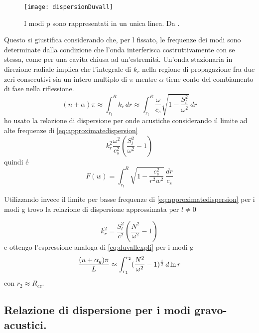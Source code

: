 \documentclass[../main.tex]{subfiles}
\begin{document}
\begin{wrapfigure}[15]{r}{0.45\textwidth}
\centering
\texttt{[image: dispersionDuvall]}
\caption{I modi p sono rappresentati in un unica linea. Da \cite{duv82dispersion}.}
\end{wrapfigure}

Questo si giustifica considerando che, per l fissato, le frequenze dei modi sono determinate dalla condizione che l'onda interferisca costruttivamente con se stessa, come per una cavita chiusa ad un'estremit\'a. Un'onda stazionaria in direzione radiale implica che l'integrale di $k_r$ nella regione di propagazione fra due zeri consecutivi sia un intero multiplo di $\pi$ mentre $\alpha$ tiene conto del combiamento di fase nella riflessione.
\begin{equation}
(n+\alpha)\pi\approx\int_{r_t}^Rk_r\,dr\approx\int_{r_t}^R\frac{\omega}{c_s}\sqrt{1-\frac{S_l^2}{\omega^2}}\,dr\label{eq:duvallexpli}
\end{equation}
ho usato la relazione di dispersione per onde acustiche considerando il limite ad alte frequenze di \eqref{eq:approximatedispersion}
\begin{equation}
k_r^2\frac{\omega^2}{c_s^2}(\frac{S_l^2}{\omega^2}-1)
\end{equation}
quindi \'e
\begin{equation}
F(w)=\int_{r_t}^R\sqrt{1-\frac{c_s^2}{r^2w^2}}\,\frac{dr}{c_s}\label{eq:duvallf}
\end{equation}

Utilizzando invece il limite per basse frequenze di \eqref{eq:approximatedispersion} per i modi g trovo la relazione di dispersione approssimata per $l\neq0$

\begin{equation}
k_r^2=\frac{S_l^2}{c^2}(\frac{N^2}{\omega^2}-1)\label{eq:dispersionag}
\end{equation}
e ottengo l'espressione analoga di \eqref{eq:duvallexpli} per i modi g
\begin{equation}
\frac{(n+\alpha_g)\pi}{L}\approx\int_{r_1}^{r_2}(\frac{N^2}{\omega^2}-1)^{\frac{1}{2}}\,d\ln{r}\label{eq:duvallg}
\end{equation}
con $r_2\approx R_{cz}$.

\subsection{Relazione di dispersione per i modi gravo-acustici.}
\end{document}
